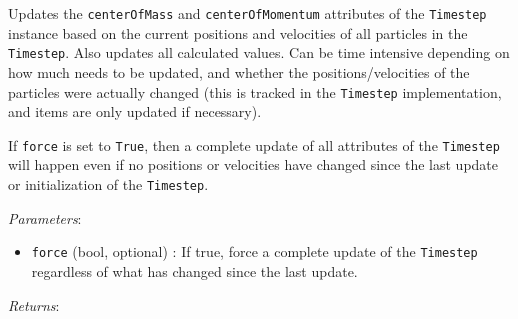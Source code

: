 \documentclass{article}
\begin{document}
\begin{itemize}
Updates the \verb!centerOfMass! and \verb!centerOfMomentum! attributes of the \verb!Timestep! instance based on the current positions and velocities of all particles in the \verb!Timestep!. Also updates all calculated values. Can be time intensive depending on how much needs to be updated, and whether the positions/velocities of the particles were actually changed (this is tracked in the \verb!Timestep! implementation, and items are only updated if necessary).

If \verb!force! is set to \verb!True!, then a complete update of all attributes of the \verb!Timestep! will happen even if no positions or velocities have changed since the last update or initialization of the \verb!Timestep!.

\textit{Parameters}: \begin{itemize}

\item \verb!force! (bool, optional) : If true, force a complete update of the \verb!Timestep! regardless of what has changed since the last update.

\end{itemize}

\textit{Returns}:



\end{itemize}
\end{document}
